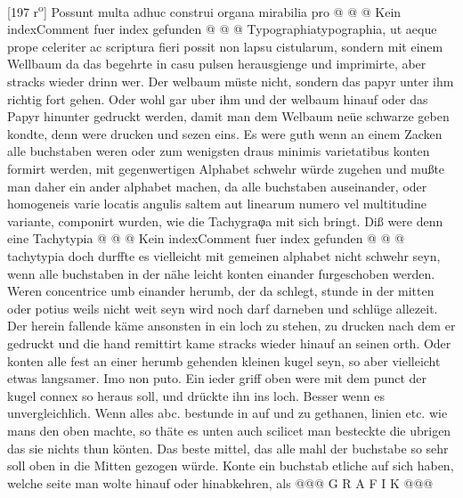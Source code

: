             [197 r\textsuperscript{o}] Possunt multa adhuc construi organa  mirabilia pro  @ @ @ Kein indexComment fuer index gefunden @ @ @ Typographiatypographia, ut aeque  prope celeriter ac scriptura fieri possit  non lapsu cistularum, sondern mit einem Wellbaum\protect{} da das begehrte in casu pulsen herausgienge und imprimirte, aber stracks  wieder drinn wer. Der welbaum\protect{}  m\"{u}ste nicht, sondern das papyr\protect{} unter ihm  richtig fort gehen. Oder wohl gar uber  ihm und der welbaum\protect{} hinauf oder das Papyr\protect{} hinunter gedruckt werden,  damit man dem Welbaum\protect{} ne\"{u}e  schwarze geben kondte, denn were  drucken und sezen eins. Es were guth  wenn an einem Zacken alle buchstaben  weren oder zum wenigsten draus minimis  varietatibus konten formirt werden,  mit gegenwertigen Alphabet  schwehr w\"{u}rde zugehen und mußte man daher  ein ander alphabet machen, da alle  buchstaben auseinander, oder homogeneis  varie locatis angulis saltem aut linearum  numero vel multitudine variante, componirt  wurden, wie die Tachygraφa\protect{} mit sich  bringt. Diß were denn eine Tachytypia @ @ @ Kein indexComment fuer index gefunden @ @ @ tachytypia doch durffte es vielleicht mit  gemeinen alphabet nicht schwehr seyn,  wenn alle buchstaben in der n\"{a}he  leicht konten einander furgeschoben werden.  Weren concentrice umb einander herumb,  der da schlegt, stunde in der mitten oder  potius weils nicht weit seyn wird  noch darf darneben und schl\"{u}ge allezeit.  Der herein fallende k\"{a}me ansonsten  in ein loch zu stehen, zu drucken nach  dem er gedruckt und die hand  remittirt kame stracks wieder hinauf  an seinen orth. Oder konten  alle fest an einer herumb gehenden  kleinen kugel seyn, so aber vielleicht  etwas langsamer. Imo non puto.  Ein ieder griff oben were mit  dem punct der kugel connex so heraus  soll, und dr\"{u}ckte ihn ins loch. Besser  wenn es unvergleichlich. Wenn alles  abc. bestunde in auf und zu gethanen,  linien etc. wie mans den oben machte, so  th\"{a}te es unten auch scilicet man besteckte die  ubrigen das sie nichts thun k\"{o}nten. Das beste  mittel, das alle mahl der buchstabe so sehr  soll oben in die Mitten gezogen w\"{u}rde. Konte  ein buchstab  etliche auf sich haben,  welche seite man wolte hinauf oder hinabkehren, als @@@ G R A F I K @@@%
